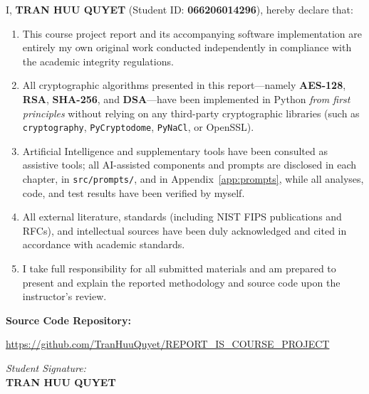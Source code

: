 \documentclass[12pt,a4paper]{report}
\begin{document}
I, \textbf{TRAN HUU QUYET} (Student ID: \textbf{066206014296}), hereby declare that:
\begin{enumerate}
    \item This course project report and its accompanying software implementation are entirely my own original work conducted independently in compliance with the academic integrity regulations.
    \item All cryptographic algorithms presented in this report---namely \textbf{AES-128}, \textbf{RSA}, \textbf{SHA-256}, and \textbf{DSA}---have been implemented in Python \emph{from first principles} without relying on any third-party cryptographic libraries (such as \texttt{cryptography}, \texttt{PyCryptodome}, \texttt{PyNaCl}, or OpenSSL).
    \item Artificial Intelligence and supplementary tools have been consulted as assistive tools; all AI-assisted components and prompts are disclosed in each chapter, in \texttt{src/prompts/}, and in Appendix~\ref{app:prompts}, while all analyses, code, and test results have been verified by myself.
    \item All external literature, standards (including NIST FIPS publications and RFCs), and intellectual sources have been duly acknowledged and cited in accordance with academic standards.
    \item I take full responsibility for all submitted materials and am prepared to present and explain the reported methodology and source code upon the instructor's review.
\end{enumerate}

\vspace{0.6cm}
\noindent\textbf{Source Code Repository:}\par
\noindent\url{https://github.com/TranHuuQuyet/REPORT_IS_COURSE_PROJECT}

\vspace{1.2cm}
\begin{flushright}
    \textit{Student Signature:}\\[0.5cm]
    \textbf{TRAN HUU QUYET}
\end{flushright}

\clearpage
\tableofcontents
\clearpage
\listoffigures
\clearpage
\listoftables

\clearpage
{}
\setcounter{page}{1}
\end{document}
